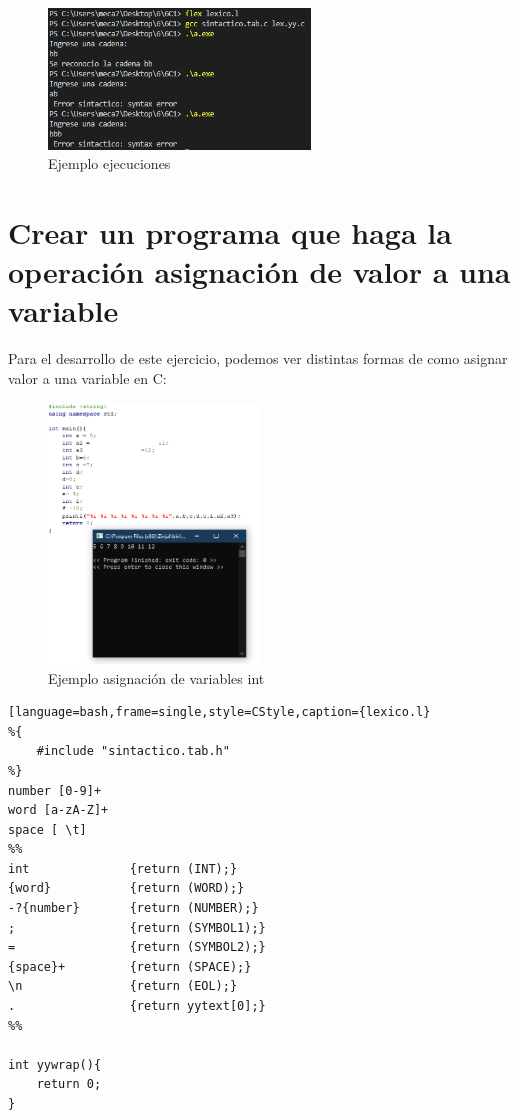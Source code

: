 \documentclass[12pt]{article}
\begin{document}
\clearpage
\newpage

\begin{figure}[h]
    \centering
    \includegraphics[width=0.62\textwidth]{images/Capture003A.PNG}
    \caption{Ejemplo ejecuciones}
\end{figure}

\section{Crear un programa que haga la operación asignación de valor a una variable}

Para el desarrollo de este ejercicio, podemos ver distintas formas de como asignar valor a una variable en C:

\begin{figure}[h]
    \centering
    \includegraphics[width=0.5\textwidth]{images/CaptureZinjai.PNG}
    \caption{Ejemplo asignación de variables int}
\end{figure}


\clearpage
\newpage

\begin{lstlisting}[language=bash,frame=single,style=CStyle,caption={lexico.l}
%{
    #include "sintactico.tab.h"
%}
number [0-9]+
word [a-zA-Z]+
space [ \t]
%%
int              {return (INT);}
{word}           {return (WORD);}
-?{number}       {return (NUMBER);}
;                {return (SYMBOL1);}
=                {return (SYMBOL2);}
{space}+         {return (SPACE);}  
\n               {return (EOL);}
.                {return yytext[0];}
%%

int yywrap(){
    return 0;
}
\end{lstlisting}
\end{document}
